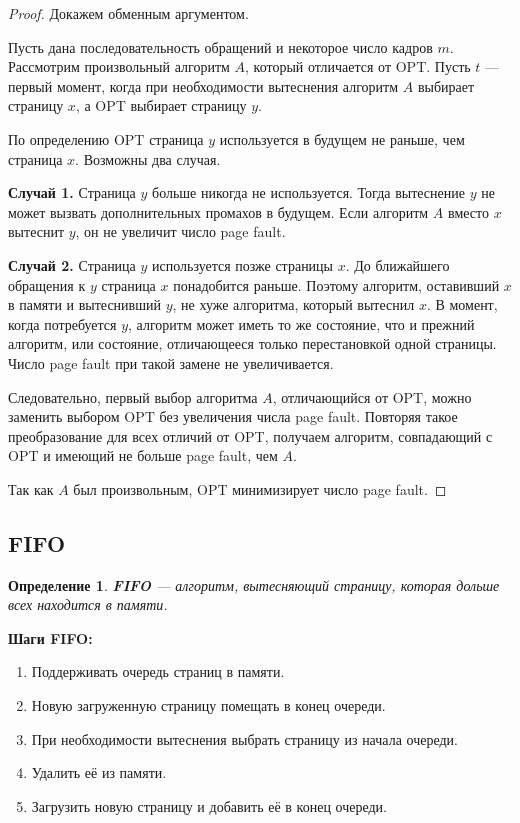 \documentclass[a4paper,12pt]{article}
\newtheorem{definition}{Определение}
\begin{document}
\begin{proof}
Докажем обменным аргументом.

Пусть дана последовательность обращений и некоторое число кадров $m$.
Рассмотрим произвольный алгоритм $A$, который отличается от OPT.
Пусть $t$ --- первый момент, когда при необходимости вытеснения алгоритм $A$ выбирает страницу $x$, а OPT выбирает страницу $y$.

По определению OPT страница $y$ используется в будущем не раньше, чем страница $x$.
Возможны два случая.

\textbf{Случай 1.} Страница $y$ больше никогда не используется.
Тогда вытеснение $y$ не может вызвать дополнительных промахов в будущем. Если алгоритм $A$ вместо $x$ вытеснит $y$, он не увеличит число page fault.

\textbf{Случай 2.} Страница $y$ используется позже страницы $x$.
До ближайшего обращения к $y$ страница $x$ понадобится раньше. Поэтому алгоритм, оставивший $x$ в памяти и вытеснивший $y$, не хуже алгоритма, который вытеснил $x$.
В момент, когда потребуется $y$, алгоритм может иметь то же состояние, что и прежний алгоритм, или состояние, отличающееся только перестановкой одной страницы. Число page fault при такой замене не увеличивается.

Следовательно, первый выбор алгоритма $A$, отличающийся от OPT, можно заменить выбором OPT без увеличения числа page fault. Повторяя такое преобразование для всех отличий от OPT, получаем алгоритм, совпадающий с OPT и имеющий не больше page fault, чем $A$.

Так как $A$ был произвольным, OPT минимизирует число page fault.
\end{proof}

\subsection{FIFO}

\begin{definition}
\textbf{FIFO} --- алгоритм, вытесняющий страницу, которая дольше всех находится в памяти.
\end{definition}

\textbf{Шаги FIFO:}

\begin{enumerate}
    \item Поддерживать очередь страниц в памяти.
    \item Новую загруженную страницу помещать в конец очереди.
    \item При необходимости вытеснения выбрать страницу из начала очереди.
    \item Удалить её из памяти.
    \item Загрузить новую страницу и добавить её в конец очереди.
\end{enumerate}
\end{document}
